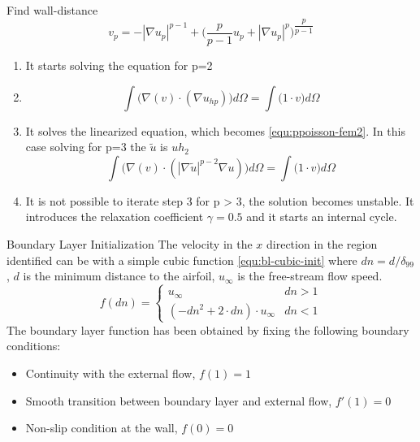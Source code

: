     \begin{frame}{Find wall-distance}
    \begin{equation}
        v_p = -|\nabla u_p|^{p-1} + \bigg ( \dfrac{p}{p-1}u_p +  |\nabla u_p|^{p}\bigg ) ^{\dfrac{p}{p-1}}
        \label{equ:vpoisson}
    \end{equation}
    \begin{enumerate}
        \item It starts solving the equation for p=2
        \item \begin{equation}
            \int \bigg (\nabla (v) \cdot (\nabla u_{hp}) \bigg )d\Omega = \int \bigg( 1\cdot v \bigg )d\Omega
        \end{equation}
        \item It solves the linearized equation, which becomes \eqref{equ:ppoisson-fem2}. In this case solving for p=3 the $\tilde{u}$ is $uh_2$
          \begin{equation}
            \int \bigg (\nabla (v) \cdot (|\nabla \tilde{u}|^{p-2} \nabla u) \bigg )d\Omega = \int \bigg( 1\cdot v \bigg )d\Omega
            \label{equ:ppoisson-fem2}
        \end{equation}
        \item It is not possible to iterate step 3 for p > 3, the solution becomes unstable. It introduces the relaxation coefficient $\gamma = 0.5$ and it starts an internal cycle.
    \end{enumerate}
    \end{frame}

    \begin{frame}{Boundary Layer Initialization}
    The velocity in the $x$ direction in the region identified can be with a simple cubic function \eqref{equ:bl-cubic-init} where $dn = d/\delta_{99}$, $d$ is the minimum distance to the airfoil, $u_\infty$ is the free-stream flow speed.
    \begin{equation}
        f(dn) = 
        \begin{cases}
            u_\infty & dn>1\\
            ( -dn^2+2\cdot dn )\cdot u_\infty &  dn<1
        \end{cases}
        \label{equ:bl-cubic-init}
    \end{equation}
     The boundary layer function has been obtained by fixing the following boundary conditions:
    \begin{itemize}
        \item Continuity with the external flow, $f(1)=1$ 
        \item Smooth transition between boundary layer and external flow, $f'(1)=0$ 
        \item Non-slip condition at the wall, $f(0)=0$
    \end{itemize}
    \end{frame}
    
